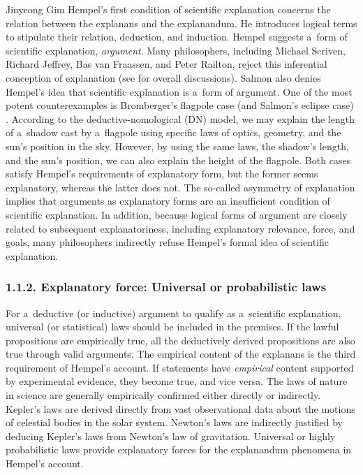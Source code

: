 \begin{artengenv}{Jinyeong Gim}
Hempel's first condition of scientific explanation concerns the relation between the explanans and the explanandum. He introduces logical terms to stipulate their relation, deduction, and induction. Hempel  
\parencite*[][pp.335–393]{hempel_aspects_1965} %
 suggests a~form of scientific explanation, \textit{argument}. Many philosophers, including Michael Scriven, Richard Jeffrey, Bas van Fraassen, and Peter Railton, reject this inferential conception of explanation
 (see \cite{salmon_four_1989} for overall discussions).
 Salmon also denies Hempel's idea that scientific explanation is a~form of argument. One of the most potent counterexamples is Bromberger's flagpole case (and Salmon's eclipse case)
\parencite[][pp.46–47]{salmon_four_1989}. %
According to the deductive-nomological (DN) model, we may explain the length of a~shadow cast by a~flagpole using specific laws of optics, geometry, and the sun's position in the sky. However, by using the same laws, the shadow's length, and the sun's position, we can also explain the height of the flagpole. Both cases satisfy Hempel's requirements of explanatory form, but the former seems explanatory, whereas the latter does not. The so-called asymmetry of explanation implies that arguments as explanatory forms are an insufficient condition of scientific explanation. In addition, because logical forms of argument are closely related to subsequent explanatoriness, including explanatory relevance, force, and goals, many philosophers indirectly refuse Hempel's formal idea of scientific explanation.

\subsubsection{1.1.2. Explanatory force: Universal or probabilistic laws}

For a~deductive (or inductive) argument to qualify as a~scientific explanation, universal (or statistical) laws should be included in the premises. If the lawful propositions are empirically true, all the deductively derived propositions are also true through valid arguments. The empirical content of the explanans is the third requirement of Hempel's account. If statements have \textit{empirical} content supported by experimental evidence, they become true, and vice versa. The laws of nature in science are generally empirically confirmed either directly or indirectly. Kepler's laws are derived directly from vast observational data about the motions of celestial bodies in the solar system. Newton's laws are indirectly justified by deducing Kepler's laws from Newton's law of gravitation. Universal or highly probabilistic laws provide explanatory forces for the explanandum phenomena in Hempel's account.


\end{artengenv}
